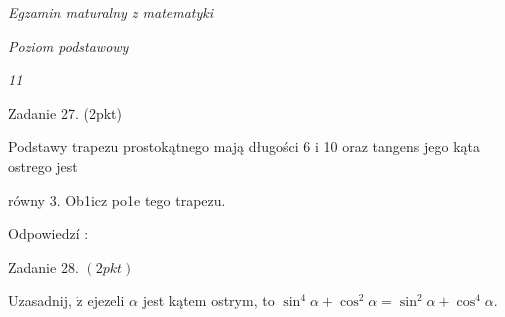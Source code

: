 \documentclass[a4paper,12pt]{article}
\begin{document}
{\it Egzamin maturalny z matematyki}

{\it Poziom podstawowy}

{\it 11}

Zadanie 27. (2pkt)

Podstawy trapezu prostokątnego mają długości 6 i 10 oraz tangens jego kąta ostrego jest

równy 3. Ob1icz po1e tego trapezu.

Odpowiedzí :

Zadanie 28. $(2pkt)$

Uzasadnij, $\dot{\mathrm{z}}$ ejezeli $\alpha$ jest kątem ostrym, to $\sin^{4}\alpha+\cos^{2}\alpha=\sin^{2}\alpha+\cos^{4}\alpha.$
\end{document}
